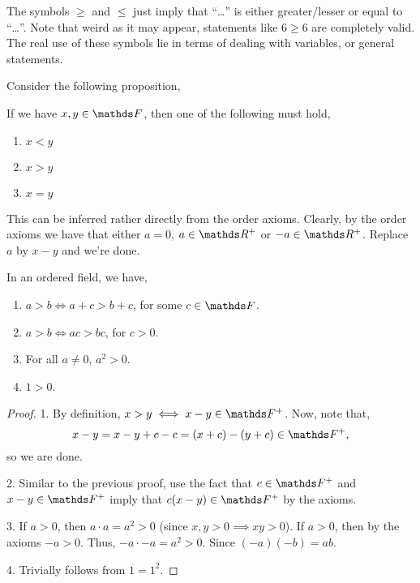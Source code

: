 The symbols \(\ge\) and \(\le\) just imply that ``\dots'' is either greater/lesser or equal to ``\dots''.
Note that weird as it may appear, statements like \(6 \ge 6\) are completely valid. 
The real use of these symbols lie in terms of dealing with variables, or general 
statements.

Consider the following proposition, 

\begin{plainprop}[Trichotomy]
    If we have \(x, y \in \FF\), then one of the following must hold, 
    \begin{enumerate}
        \item \(x < y\)
        \item \(x > y\)
        \item \(x = y\)
    \end{enumerate}
\end{plainprop}

This can be inferred rather directly from the order axioms. Clearly, by the order 
axioms we have that either \(a = 0\), \(a \in \RR^+\) or \(-a \in \RR^+\).
Replace \(a\) by \(x - y\) and we're done.

\begin{proposition}
    In an ordered field, we have,
    \begin{enumerate}
        \item \(a > b \iff a + c > b + c\), for some \(c \in \FF\).
        \item \(a > b \iff ac > bc\), for \(c > 0\).
        \item For all \(a \ne 0\), \(a^2 > 0\).
        \item \(1 > 0\).
    \end{enumerate}
\end{proposition}

\begin{proof}
    1. By definition, \(x > y \iff x - y \in \FF^+\). Now, note that,
    \begin{equation*}
        x - y = x - y + c - c = (x + c) - (y + c) \in \FF^+,
    \end{equation*}
    so we are done.

    2. Similar to the previous proof, use the fact that \(c \in \FF^+\) and 
    \(x - y \in \FF^+\) imply that \(c(x - y) \in \FF^+\) by the axioms.

    3. If \(a > 0\), then \(a \cdot a = a^2> 0\) (since \(x, y > 0 \implies xy > 0\)). 
    If \(a > 0\), then by the axioms \(-a > 0\). Thus, \(-a \cdot -a = a^2 > 0\).
    Since \((-a)(-b) = ab\).

    4. Trivially follows from \(1 = 1^2\).
\end{proof}

